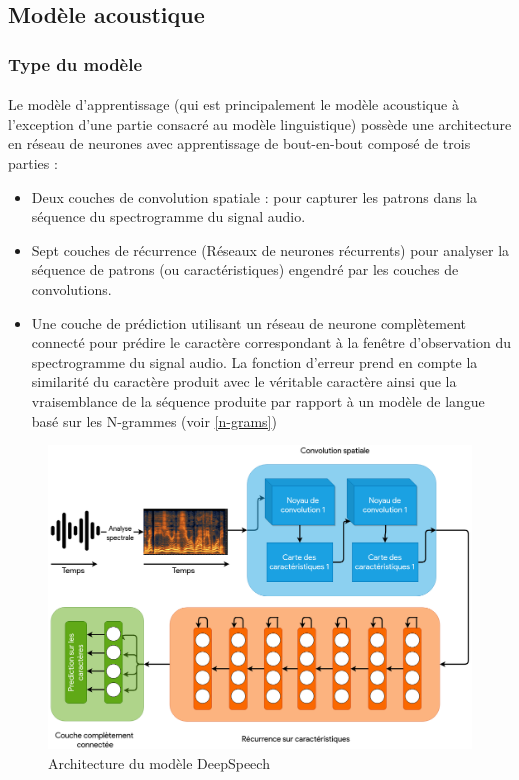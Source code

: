 	\subsection{Modèle acoustique}
		\subsubsection*{Type du modèle}
		\paragraph{}
		Le modèle d'apprentissage (qui est principalement le modèle acoustique à l'exception d'une partie consacré au modèle linguistique) possède une architecture en réseau de neurones avec apprentissage de bout-en-bout composé de trois parties : 
		\begin{itemize}
			\item Deux couches de convolution spatiale : pour capturer les patrons dans la séquence du spectrogramme du signal audio.
			\item Sept couches de récurrence (Réseaux de neurones récurrents) pour analyser la séquence de patrons (ou caractéristiques) engendré par les couches de convolutions. 
			\item Une couche de prédiction utilisant un réseau de neurone complètement connecté pour prédire le caractère correspondant à la fenêtre d'observation du spectrogramme du signal audio. La fonction d'erreur prend en compte la similarité du caractère produit avec le véritable caractère ainsi que la vraisemblance de la séquence produite par rapport à un modèle de langue basé sur les N-grammes (voir \ref{n-grams})
		\end{itemize}
		\begin{figure}[H] 
			\centering
			\includegraphics[width=0.88\linewidth]{images/Conception/ASR/deeps_speech_arch.png}
			\caption{Architecture du modèle DeepSpeech \cite{deepspeech_paper}}
			\label{fig:deepSpeechArch}
			
		\end{figure}
